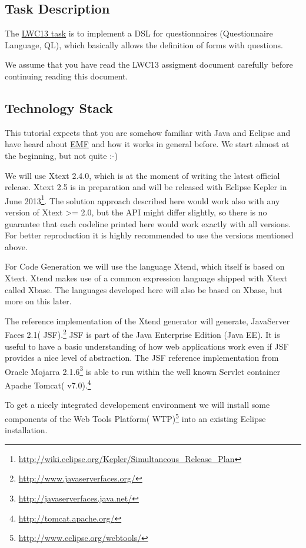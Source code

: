 \subsection{Task Description}
The {\href{http://www.languageworkbenches.net/images/5/53/Ql.pdf}{LWC13 task}}
is to implement a DSL for questionnaires (Questionnaire Language, QL), which
basically allows the definition of forms with questions.

We assume that you have read the LWC13 assigment document carefully before
continuing reading this document.


\subsection{Technology Stack}
\label{subsec:technologyStack}
This tutorial expects that you are somehow familiar with Java and Eclipse and
have heard about \url{EMF} and how it works in general before. We start almost at the
beginning, but not quite :-) 

We will use Xtext 2.4.0, which is at the moment of writing the latest official
release.
Xtext 2.5 is in preparation and will be released with Eclipse Kepler in June
2013\footnote{\url{http://wiki.eclipse.org/Kepler/Simultaneous_Release_Plan}}.
The solution approach described here would work also with any version
of Xtext >= 2.0, but the API might differ slightly, so there is no guarantee
that each codeline printed here would work exactly with all versions. For better
reproduction it is highly recommended to use the versions mentioned above.

For Code Generation we will use the language Xtend, which itself is based on
Xtext. Xtend makes use of a common expression language shipped with Xtext called
Xbase. The languages developed here will also be based on Xbase, but more on
this later.

The reference implementation of the Xtend generator will generate, 
JavaServer Faces 2.1( JSF).\footnote{\url{http://www.javaserverfaces.org/}} 
JSF is part of the Java Enterprise Edition (Java EE). It is useful to have a 
basic understanding of how web applications work even if JSF provides a nice level 
of abstraction. The JSF reference implementation from 
Oracle Mojarra 2.1.6\footnote{\url{http://javaserverfaces.java.net/}} is able to run 
within the well known Servlet container Apache Tomcat( v7.0).\footnote{\url{http://tomcat.apache.org/}} 

To get a nicely integrated developement environment we will install some components of the
Web Tools Platform( WTP)\footnote{\url{http://www.eclipse.org/webtools/}} into an existing Eclipse installation.